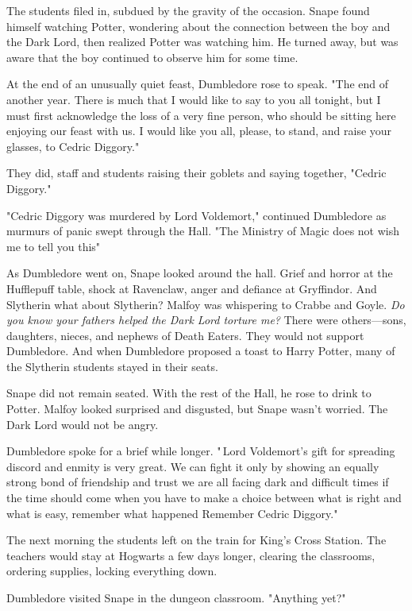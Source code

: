 The students filed in, subdued by the gravity of the occasion. Snape found himself watching Potter, wondering about the connection between the boy and the Dark Lord, then realized Potter was watching him. He turned away, but was aware that the boy continued to observe him for some time.

At the end of an unusually quiet feast, Dumbledore rose to speak. "The end of another year. There is much that I would like to say to you all tonight, but I must first acknowledge the loss of a very fine person, who should be sitting here enjoying our feast with us. I would like you all, please, to stand, and raise your glasses, to Cedric Diggory."

They did, staff and students raising their goblets and saying together, "Cedric Diggory."

"Cedric Diggory was murdered by Lord Voldemort," continued Dumbledore as murmurs of panic swept through the Hall. "The Ministry of Magic does not wish me to tell you this{\el}"

As Dumbledore went on, Snape looked around the hall. Grief and horror at the Hufflepuff table, shock at Ravenclaw, anger and defiance at Gryffindor. And Slytherin{\el} what about Slytherin? Malfoy was whispering to Crabbe and Goyle. \emph{Do you know your fathers helped the Dark Lord torture me?} There were others—sons, daughters, nieces, and nephews of Death Eaters. They would not support Dumbledore. And when Dumbledore proposed a toast to Harry Potter, many of the Slytherin students stayed in their seats.

Snape did not remain seated. With the rest of the Hall, he rose to drink to Potter. Malfoy looked surprised and disgusted, but Snape wasn't worried. The Dark Lord would not be angry.

Dumbledore spoke for a brief while longer. "{\el}\,Lord Voldemort's gift for spreading discord and enmity is very great. We can fight it only by showing an equally strong bond of friendship and trust{\el} we are all facing dark and difficult times{\el} if the time should come when you have to make a choice between what is right and what is easy, remember what happened{\el} Remember Cedric Diggory."

The next morning the students left on the train for King's Cross Station. The teachers would stay at Hogwarts a few days longer, clearing the classrooms, ordering supplies, locking everything down.

Dumbledore visited Snape in the dungeon classroom. "Anything yet?"

